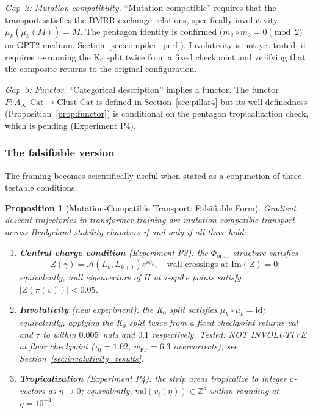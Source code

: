 \documentclass[11pt]{amsart}
\newtheorem{proposition}[theorem]{Proposition}
\begin{document}
\emph{Gap~2: Mutation compatibility.}
``Mutation-compatible'' requires that the transport satisfies the
BMRR exchange relations, specifically involutivity
$\mu_k(\mu_k(M)) = M$.
The pentagon identity is confirmed ($m_2 \circ m_2 = 0 \pmod 2$
on GPT2-medium, Section~\ref{sec:compiler_perf}).
Involutivity is not yet tested: it requires re-running the K$_0$
split twice from a fixed checkpoint and verifying that the composite
returns to the original configuration.

\emph{Gap~3: Functor.}
``Categorical description'' implies a functor.
The functor $F: A_\infty\text{-Cat} \to \mathrm{Clust\text{-}Cat}$
is defined in Section~\ref{sec:pillar4} but its well-definedness
(Proposition~\ref{prop:functor}) is conditional on the pentagon
tropicalization check, which is pending (Experiment P4).

\subsubsection*{The falsifiable version}

The framing becomes scientifically useful when stated as a conjunction
of three testable conditions:

\begin{proposition}[Mutation-Compatible Transport: Falsifiable Form]
\label{prop:falsifiable}
Gradient descent trajectories in transformer training are
mutation-compatible transport across Bridgeland stability chambers
if and only if all three hold:
\begin{enumerate}
\item \textbf{Central charge condition} (Experiment P3):
  the $\Phi_\mathrm{orbit}$ structure satisfies
  \[
    Z(\gamma) = \mathcal{A}(L_k, L_{k+1})e^{i\phi_k},
    \quad \text{wall crossings at } \mathrm{Im}(Z) = 0;
  \]
  equivalently, null eigenvectors of $H$ at $\tau$-spike points
  satisfy $|Z(\pi(v))| < 0.05$.
\item \textbf{Involutivity} (new experiment):
  the K$_0$ split satisfies $\mu_k \circ \mu_k = \mathrm{id}$;
  equivalently, applying the K$_0$ split twice from a fixed checkpoint
  returns val and $\tau$ to within $0.005$~nats and $0.1$
  respectively.
  \emph{Tested}: NOT INVOLUTIVE at floor checkpoint
  ($\tau_0=1.02$, $w_\mathrm{FF}=6.3$ overcorrects);
  see Section~\ref{sec:involutivity_results}.
\item \textbf{Tropicalization} (Experiment P4):
  the strip areas tropicalize to integer $c$-vectors as $\eta \to 0$;
  equivalently, $\mathrm{val}(v_i(\eta)) \in \mathbb{Z}^d$ within
  rounding at $\eta = 10^{-4}$.
\end{enumerate}
\end{proposition}
\end{document}
